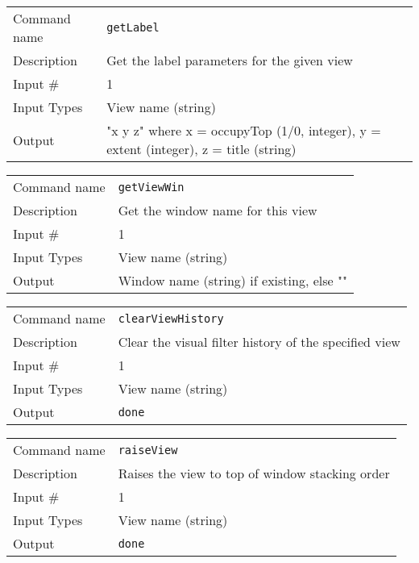 \bigskip

\noindent
\begin{tabular}{l|p{5in}}
\hline
Command name & {\tt getLabel} \\
Description  & Get the label parameters for the given view \\
Input \#     & 1 \\
Input Types  & View name (string) \\
Output       & "x y z" where x = occupyTop (1/0, integer),
               y = extent (integer), z = title (string) \\
\hline
\end{tabular}

\bigskip

\noindent
\begin{tabular}{l|p{5in}}
\hline
Command name & {\tt getViewWin} \\
Description  & Get the window name for this view \\
Input \#     & 1 \\
Input Types  & View name (string) \\
Output       & Window name (string) if existing, else "" \\
\hline
\end{tabular}

\bigskip

\noindent
\begin{tabular}{l|p{5in}}
\hline
Command name & {\tt clearViewHistory} \\
Description  & Clear the visual filter history of the specified view \\
Input \#     & 1 \\
Input Types  & View name (string) \\
Output       & {\tt done} \\
\hline
\end{tabular}

\bigskip

\noindent
\begin{tabular}{l|p{5in}}
\hline
Command name & {\tt raiseView} \\
Description  & Raises the view to top of window stacking order \\
Input \#     & 1 \\
Input Types  & View name (string) \\
Output       & {\tt done} \\
\hline
\end{tabular}

\bigskip

